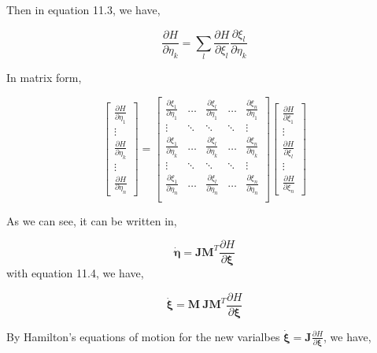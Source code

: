 \documentclass[12pt]{article}
\numberwithin{equation}{section}
\begin{document}
Then in equation 11.3, we have,

\[
    \frac{\partial H}{\partial \eta_k} = \sum_{l}{\frac{\partial H}{\partial \xi_l}\frac{\partial \xi_l}{\partial \eta_k}} 
\]

In matrix form,

\[
    \begin{bmatrix}
        \frac{\partial H}{\partial \eta_1}\\
        \vdots\\
        \frac{\partial H}{\partial \eta_k}\\
        \vdots\\
        \frac{\partial H}{\partial \eta_n}
    \end{bmatrix} = 
    \begin{bmatrix}
        \frac{\partial \xi_1}{\partial \eta_1}&\hdots&\frac{\partial \xi_l}{\partial \eta_1}&\hdots&\frac{\partial \xi_n}{\partial \eta_1}\\
        \vdots&\ddots&\ddots&\ddots&\vdots\\
        \frac{\partial \xi_1}{\partial \eta_k}&\hdots&\frac{\partial \xi_l}{\partial \eta_k}&\hdots&\frac{\partial \xi_n}{\partial \eta_k}\\
        \vdots&\ddots&\ddots&\ddots&\vdots\\
        \frac{\partial \xi_1}{\partial \eta_n}&\hdots&\frac{\partial \xi_l}{\partial \eta_n}&\hdots&\frac{\partial \xi_n}{\partial \eta_n}\\
    \end{bmatrix}
    \begin{bmatrix}
        \frac{\partial H}{\partial \xi_{1}}\\
        \vdots\\
        \frac{\partial H}{\partial \xi_{l}}\\
        \vdots\\
        \frac{\partial H}{\partial \xi_{n}}
    \end{bmatrix}
\]

As we can see, it can be written in,

\begin{equation}
    \pmb{\dot{\eta}} = \pmb{J}\pmb{M}^{T}\frac{\partial H}{\partial \pmb{\xi}}
\end{equation}
with equation 11.4, we have,

\[
    \dot{\pmb{\xi}} = \pmb{M}\ \pmb{J}\pmb{M}^T \frac{\partial H}{\partial \pmb{\xi}}
\]

By Hamilton's equations of motion for the new varialbes $\pmb{\dot{\xi}} = \pmb{J}\frac{\partial H}{\partial \pmb{\xi}}$, we have,
\end{document}
